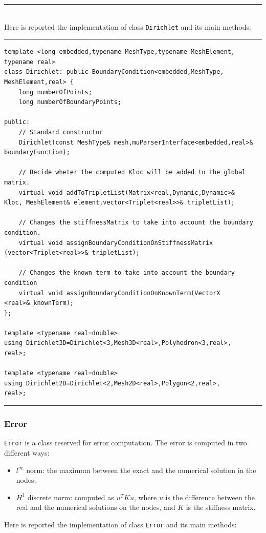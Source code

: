 \noindent\rule{16cm}{1pt}\\

Here is reported the implementation of class \verb|Dirichlet| and its main methods:

\noindent\rule{16cm}{1pt}
\begin{lstlisting}[caption=File \texttt{Dirichlet.h}]
template <long embedded,typename MeshType,typename MeshElement,
typename real>
class Dirichlet: public BoundaryCondition<embedded,MeshType,
MeshElement,real> {
    long numberOfPoints;
    long numberOfBoundaryPoints;

public:
    // Standard constructor
    Dirichlet(const MeshType& mesh,muParserInterface<embedded,real>& 
boundaryFunction);
	
    // Decide wheter the computed Kloc will be added to the global matrix.
    virtual void addToTripletList(Matrix<real,Dynamic,Dynamic>& 
Kloc, MeshElement& element,vector<Triplet<real>>& tripletList);
	
    // Changes the stiffnessMatrix to take into account the boundary condition.
    virtual void assignBoundaryConditionOnStiffnessMatrix
(vector<Triplet<real>>& tripletList);
	
    // Changes the known term to take into account the boundary condition
    virtual void assignBoundaryConditionOnKnownTerm(VectorX
<real>& knownTerm);	
};

template <typename real=double>
using Dirichlet3D=Dirichlet<3,Mesh3D<real>,Polyhedron<3,real>,
real>;

template <typename real=double>
using Dirichlet2D=Dirichlet<2,Mesh2D<real>,Polygon<2,real>,
real>;
\end{lstlisting}
\noindent\rule{16cm}{1pt}

\subsubsection{Error}
\verb|Error| is a class reserved for error computation. The error is computed in two different ways:
\begin{itemize}
\item $l^\infty$ norm: the maximum between the exact and the numerical solution in the nodes;
\item $H^1$ discrete norm: computed as $u^TKu$, where $u$ is the difference between the real and the numerical solutions on the nodes, and $K$ is the stiffness matrix. 
\end{itemize}

Here is reported the implementation of class \verb|Error| and its main methods:

